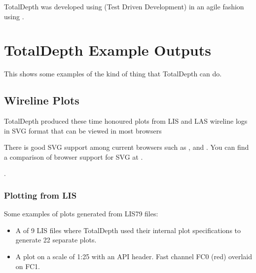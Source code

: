 \documentclass[letterpaper,10pt,english]{sphinxmanual}
\begin{document}
TotalDepth was developed using  (Test Driven Development) in an agile fashion using .


\section{TotalDepth Example Outputs}
\label{\detokenize{examples/examples:totaldepth-example-outputs}}\label{\detokenize{examples/examples::doc}}\label{\detokenize{examples/examples:totaldepth-examples}}
This shows some examples of the kind of thing that TotalDepth can do.


\subsection{Wireline Plots}
\label{\detokenize{examples/examples:wireline-plots}}\label{\detokenize{examples/examples:totaldepth-examples-plots}}
TotalDepth produced these time honoured plots from LIS and LAS wireline logs in SVG format that can be viewed in most browsers %
\begin{footnote}[1]\sphinxAtStartFootnote
There is good SVG support among current browsers such as ,   and  . You can find a comparison of browser support for SVG at .
%
\end{footnote}.


\subsubsection{Plotting from LIS}
\label{\detokenize{examples/examples:plotting-from-lis}}
Some examples of plots generated from LIS79 files:
\begin{itemize}
\item {} 
A  of 9 LIS files where TotalDepth used their internal plot specifications to generate 22 separate plots.

\item {} 
A  plot on a scale of 1:25 with an API header. Fast channel FC0 (red) overlaid on FC1.

\end{itemize}
\end{document}
